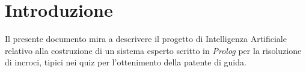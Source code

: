 \chapter{Introduzione}

Il presente documento mira a descrivere il progetto di Intelligenza Artificiale relativo alla costruzione di un sistema esperto scritto in \emph{Prolog} per la risoluzione di incroci, tipici nei quiz per l'ottenimento della patente di guida.

